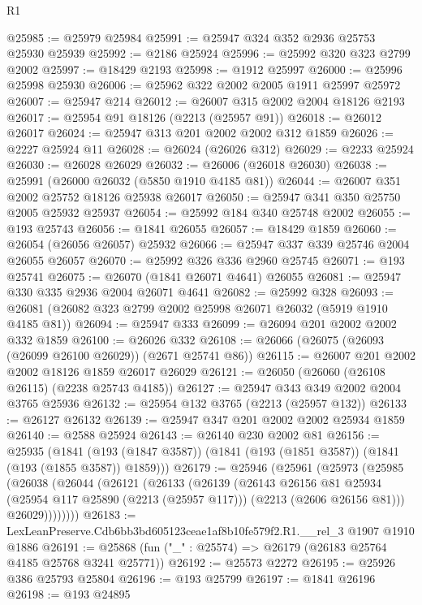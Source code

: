 \begin{lexlean}{R1}
\begin{coremodule}
@25985 := @25979 @25984
@25991 := @25947 @324 @352 @2936 @25753 @25930 @25939
@25992 := @2186 @25924
@25996 := @25992 @320 @323 @2799 @2002
@25997 := @18429 @2193
@25998 := @1912 @25997
@26000 := @25996 @25998 @25930
@26006 := @25962 @322 @2002 @2005 @1911 @25997 @25972
@26007 := @25947 @214
@26012 := @26007 @315 @2002 @2004 @18126 @2193
@26017 := @25954 @91 @18126 (@2213 (@25957 @91))
@26018 := @26012 @26017
@26024 := @25947 @313 @201 @2002 @2002 @312 @1859
@26026 := @2227 @25924 @11
@26028 := @26024 (@26026 @312)
@26029 := @2233 @25924
@26030 := @26028 @26029
@26032 := @26006 (@26018 @26030)
@26038 := @25991 (@26000 @26032 (@5850 @1910 @4185 @81))
@26044 := @26007 @351 @2002 @25752 @18126 @25938 @26017
@26050 := @25947 @341 @350 @25750 @2005 @25932 @25937
@26054 := @25992 @184 @340 @25748 @2002
@26055 := @193 @25743
@26056 := @1841 @26055
@26057 := @18429 @1859
@26060 := @26054 (@26056 @26057) @25932
@26066 := @25947 @337 @339 @25746 @2004 @26055 @26057
@26070 := @25992 @326 @336 @2960 @25745
@26071 := @193 @25741
@26075 := @26070 (@1841 @26071 @4641) @26055
@26081 := @25947 @330 @335 @2936 @2004 @26071 @4641
@26082 := @25992 @328
@26093 := @26081 (@26082 @323 @2799 @2002 @25998 @26071 @26032 (@5919 @1910 @4185 @81))
@26094 := @25947 @333
@26099 := @26094 @201 @2002 @2002 @332 @1859
@26100 := @26026 @332
@26108 := @26066 (@26075 (@26093 (@26099 @26100 @26029)) (@2671 @25741 @86))
@26115 := @26007 @201 @2002 @2002 @18126 @1859 @26017 @26029
@26121 := @26050 (@26060 (@26108 @26115) (@2238 @25743 @4185))
@26127 := @25947 @343 @349 @2002 @2004 @3765 @25936
@26132 := @25954 @132 @3765 (@2213 (@25957 @132))
@26133 := @26127 @26132
@26139 := @25947 @347 @201 @2002 @2002 @25934 @1859
@26140 := @2588 @25924
@26143 := @26140 @230 @2002 @81
@26156 := @25935
    (@1841 (@193 (@1847 @3587)) (@1841 (@193 (@1851 @3587)) (@1841 (@193 (@1855 @3587)) @1859)))
@26179 := @25946
    (@25961
      (@25973
        (@25985
          (@26038
            (@26044
              (@26121
                (@26133
                  (@26139
                    (@26143
                      @26156
                      @81
                      @25934
                      (@25954 @117 @25890 (@2213 (@25957 @117)))
                      (@2213 (@2606 @26156 @81)))
                    @26029))))))))
@26183 := LexLeanPreserve.Cdb6bb3bd605123ceae1af8b10fe579f2.R1.__rel_3 @1907 @1910 @1886
@26191 := @25868 (fun ("_" : @25574) => @26179 (@26183 @25764 @4185 @25768 @3241 @25771))
@26192 := @25573 @2272
@26195 := @25926 @386 @25793 @25804
@26196 := @193 @25799
@26197 := @1841 @26196
@26198 := @193 @24895

\end{coremodule}
\end{lexlean}

